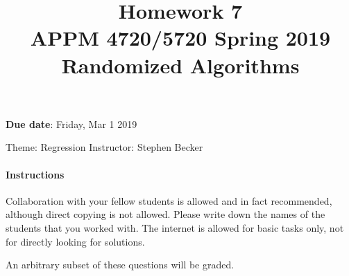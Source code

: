 \documentclass[10pt, letterpaper]{scrartcl}
\title{Homework 7 \solTitle{Selected Solutions} \\APPM 4720/5720 Spring 2019 \\ Randomized Algorithms}
\date{}
\newenvironment{instructions}{}{}
\begin{document}
\maketitle
\vspace{-6em}
\textbf{Due date}: Friday, Mar 1 2019

Theme: Regression   \hfill Instructor: Stephen Becker %

\begin{instructions}
\paragraph{Instructions}
Collaboration with your fellow students is allowed and in fact recommended, although direct copying is not allowed.  Please write down the names of the students that you worked with. The internet is allowed for basic tasks only, not for directly looking for solutions.

An arbitrary subset of these questions will be graded.

%
%
\end{instructions}
\end{document}
